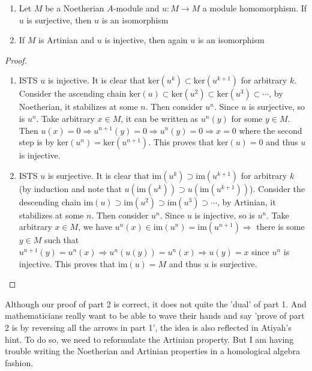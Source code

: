 \documentclass{solution}
\begin{document}
\begin{problem}
    \begin{enumerate}
        \item Let $M$ be a Noetherian $A$-module and $u: M \rightarrow M$ a module homomorphism. If $u$ is surjective, then $u$ is an isomorphism
        \item If $M$ is Artinian and $u$ is injective, then again $u$ is an isomorphism
    \end{enumerate}
\end{problem}

\begin{proof}
    \begin{enumerate}
        \item ISTS $u$ is injective. It is clear that $\mathrm{ker}(u^k) \subset \mathrm{ker}(u^{k + 1})$ for arbitrary $k$. Consider the ascending chain $\mathrm{ker}(u) \subset \mathrm{ker}(u^2) \subset \mathrm{ker}(u^3) \subset \cdots$, by Noetherian, it stabilizes at some $n$. Then consider $u^n$. Since $u$ is surjective, so is $u^n$. Take arbitrary $x \in M$, it can be written as $u^n(y)$ for some $y \in M$. Then $u(x) = 0 \Rightarrow u^{n + 1}(y) = 0 \Rightarrow u^{n}(y) = 0 \Rightarrow x = 0$ where the second step is by $\mathrm{ker}(u^n) = \mathrm{ker}(u^{n + 1})$. This proves that $\mathrm{ker}(u) = 0$ and thus $u$ is injective.
        \item ISTS $u$ is surjective. It is clear that $\mathrm{im}(u^k) \supset \mathrm{im}(u^{k + 1})$ for arbitrary $k$ (by induction and note that $u(\mathrm{im}(u^k)) \supset u(\mathrm{im}(u^{k + 1}))$). Consider the descending chain $\mathrm{im}(u) \supset \mathrm{im}(u^2) \supset \mathrm{im}(u^3) \supset \cdots$, by Artinian, it stabilizes at some $n$. Then consider $u^n$. Since $u$ is injective, so is $u^n$. Take arbitrary $x \in M$, we have $u^n(x) \in \mathrm{im}(u^n) = \mathrm{im}(u^{n + 1}) \Rightarrow$ there is some $y \in M$ such that $u^{n + 1}(y) = u^n(x) \Rightarrow u^n(u(y)) = u^n(x) \Rightarrow u(y) = x$ since $u^n$ is injective. This proves that $\mathrm{im}(u) = M$ and thus $u$ is surjective.
    \end{enumerate}
\end{proof}

{\color{red}

Although our proof of part 2 is correct, it does not quite the 'dual' of part 1. And mathematicians really want to be able to wave their hands and say 'prove of part 2 is by reversing all the arrows in part 1', the idea is also reflected in Atiyah's hint. To do so, we need to reformulate the Artinian property. But I am having trouble writing the Noetherian and Artinian properties in a homological algebra fashion.

}
\end{document}
